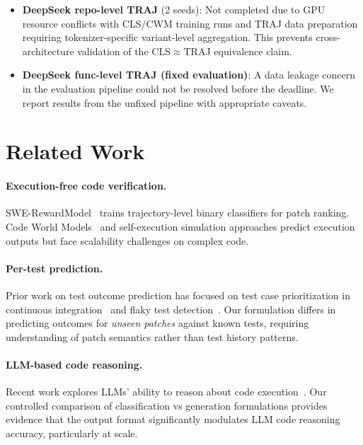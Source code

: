 \documentclass[11pt]{article}
\begin{document}
\begin{itemize}
    \item \textbf{DeepSeek repo-level TRAJ} (2 seeds): Not completed due to GPU resource conflicts with CLS/CWM training runs and TRAJ data preparation requiring tokenizer-specific variant-level aggregation. This prevents cross-architecture validation of the CLS$\approx$TRAJ equivalence claim.
    \item \textbf{DeepSeek func-level TRAJ (fixed evaluation)}: A data leakage concern in the evaluation pipeline could not be resolved before the deadline. We report results from the unfixed pipeline with appropriate caveats.
\end{itemize}

\section{Related Work}
\label{sec:related}

\paragraph{Execution-free code verification.} SWE-RewardModel~\citep{zhang2025swerm} trains trajectory-level binary classifiers for patch ranking. Code World Models~\citep{ding2024codeworldmodels} and self-execution simulation approaches predict execution outputs but face scalability challenges on complex code.

\paragraph{Per-test prediction.} Prior work on test outcome prediction has focused on test case prioritization in continuous integration~\citep{elbaum2014techniques} and flaky test detection~\citep{lam2019idflakies}. Our formulation differs in predicting outcomes for \emph{unseen patches} against known tests, requiring understanding of patch semantics rather than test history patterns.

\paragraph{LLM-based code reasoning.} Recent work explores LLMs' ability to reason about code execution~\citep{gu2024cruxeval,liu2024codemind}. Our controlled comparison of classification vs generation formulations provides evidence that the output format significantly modulates LLM code reasoning accuracy, particularly at scale.
\end{document}
